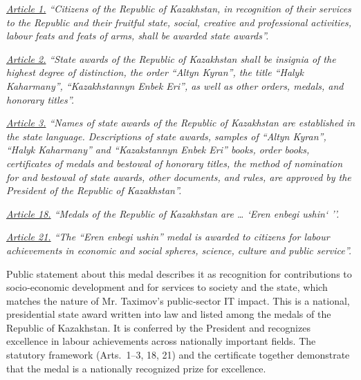 
\emph{\underline{Article 1.} ``Citizens of the Republic of Kazakhstan, in recognition of their services to the Republic and their fruitful state, social, creative and professional activities, labour feats and feats of arms, shall be awarded state awards''.}

\emph{\underline{Article 2.} ``State awards of the Republic of Kazakhstan shall be insignia of the highest degree of distinction, the order ``Altyn Kyran'', the title ``Halyk Kaharmany'', ``Kazakhstannyn Enbek Eri'', as well as other orders, medals, and honorary titles''.}

\emph{\underline{Article 3.} ``Names of state awards of the Republic of Kazakhstan are established in the state language. Descriptions of state awards, samples of ``Altyn Kyran'', ``Halyk Kaharmany'' and ``Kazakstannyn Enbek Eri'' books, order books, certificates of medals and bestowal of honorary titles, the method of nomination for and bestowal of state awards, other documents, and rules, are approved by the President of the Republic of Kazakhstan''.}

\emph{\underline{Article 18.} ``Medals of the Republic of Kazakhstan are … `Eren enbegi ushin` ''.}

\emph{\underline{Article 21.} ``The ``Eren enbegi ushin'' medal is awarded to citizens for labour achievements in economic and social spheres, science, culture and public service''.}

Public statement about this medal describes it as recognition for contributions to socio‑economic development and for services to society and the state, which matches the nature of Mr. Taximov’s public‑sector IT impact. This is a national, presidential state award written into law and listed among the medals of the Republic of Kazakhstan. It is conferred by the President and recognizes excellence in labour achievements across nationally important fields. The statutory framework (Arts.~1--3, 18, 21) and the certificate together demonstrate that the medal is a nationally recognized prize for excellence. 


